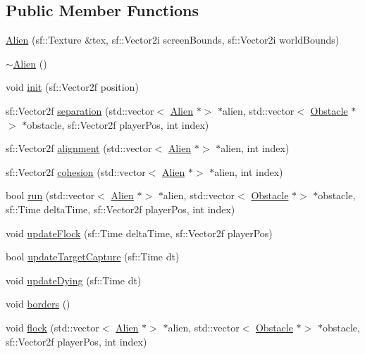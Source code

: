 \subsection*{Public Member Functions}
\begin{DoxyCompactItemize}
\item 
\hyperlink{class_alien_aa2c356638e31ea4bbd42c2aa2a8cb5f4}{Alien} (sf\+::\+Texture \&tex, sf\+::\+Vector2i screen\+Bounds, sf\+::\+Vector2i world\+Bounds)
\item 
\hyperlink{class_alien_a7cdfd79d84b51a18003bf41585aedd43}{$\sim$\+Alien} ()
\item 
void \hyperlink{class_alien_a516b6245841735741f287b38c20b8853}{init} (sf\+::\+Vector2f position)
\item 
sf\+::\+Vector2f \hyperlink{class_alien_a9eaa70b12751c0fb89f23520c2a438f3}{separation} (std\+::vector$<$ \hyperlink{class_alien}{Alien} $\ast$$>$ $\ast$alien, std\+::vector$<$ \hyperlink{class_obstacle}{Obstacle} $\ast$$>$ $\ast$obstacle, sf\+::\+Vector2f player\+Pos, int index)
\item 
sf\+::\+Vector2f \hyperlink{class_alien_a9c94d5f45dc31fdda1ef096cf3e60920}{alignment} (std\+::vector$<$ \hyperlink{class_alien}{Alien} $\ast$$>$ $\ast$alien, int index)
\item 
sf\+::\+Vector2f \hyperlink{class_alien_ad84aef6c1b05152acbed764aaf457442}{cohesion} (std\+::vector$<$ \hyperlink{class_alien}{Alien} $\ast$$>$ $\ast$alien, int index)
\item 
bool \hyperlink{class_alien_a324df6263d05f4cd623b3fc14b76afc3}{run} (std\+::vector$<$ \hyperlink{class_alien}{Alien} $\ast$$>$ $\ast$alien, std\+::vector$<$ \hyperlink{class_obstacle}{Obstacle} $\ast$$>$ $\ast$obstacle, sf\+::\+Time delta\+Time, sf\+::\+Vector2f player\+Pos, int index)
\item 
void \hyperlink{class_alien_a831772470c94eed62a50c173b002c513}{update\+Flock} (sf\+::\+Time delta\+Time, sf\+::\+Vector2f player\+Pos)
\item 
bool \hyperlink{class_alien_a6081c8a068679e203e6e920b9197e4de}{update\+Target\+Capture} (sf\+::\+Time dt)
\item 
void \hyperlink{class_alien_aa85a70c1e7ed8d7d728df94ad47b83a2}{update\+Dying} (sf\+::\+Time dt)
\item 
void \hyperlink{class_alien_a768bd4e8f7b409f8a7c3b4ac6cdd598f}{borders} ()
\item 
void \hyperlink{class_alien_a051e049fc66e47ff7ddf7bd2338b92a5}{flock} (std\+::vector$<$ \hyperlink{class_alien}{Alien} $\ast$$>$ $\ast$alien, std\+::vector$<$ \hyperlink{class_obstacle}{Obstacle} $\ast$$>$ $\ast$obstacle, sf\+::\+Vector2f player\+Pos, int index)

\end{DoxyCompactItemize}
